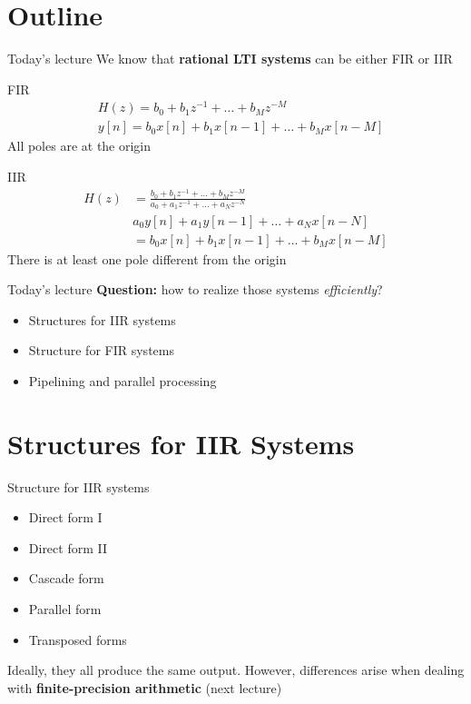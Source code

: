 \documentclass[10pt, handout]{beamer}
\begin{document}
\section{Outline}
%
\begin{frame}{Today's lecture}
We know that \textbf{rational LTI systems} can be either FIR or IIR
\begin{block}{FIR}
	\vspace{-0.5cm}
	\begin{align}
		&H(z) =  b_0 + b_1z^{-1} + \ldots + b_Mz^{-M} \tag{$z$-transform} \\
		&y[n] = b_0x[n] + b_1x[n-1] + \ldots + b_Mx[n-M] \tag{difference equation}
	\end{align}
	All poles are at the origin
\end{block}

\begin{block}{IIR}
	\vspace{-0.5cm}
	\begin{align*}
	H(z) &=  \frac{b_0 + b_1z^{-1} + \ldots + b_Mz^{-M}}{a_0 + a_1z^{-1} + \ldots + a_Nz^{-N}} \tag{$z$-transform} \\
	&a_0y[n] + a_1y[n-1] + \ldots + a_Nx[n-N]  \\
	&= b_0x[n] + b_1x[n-1] + \ldots + b_Mx[n-M] \tag{difference equation}
	\end{align*}
	There is at least one pole different from the origin
\end{block}

\end{frame}

%
\begin{frame}{Today's lecture}
	\textbf{Question:} how to realize those systems \textit{efficiently}?
	
	\begin{itemize}
		\item Structures for IIR systems
		\item Structure for FIR systems
		\item Pipelining and parallel processing
	\end{itemize}
\end{frame}

%
\section{Structures for IIR Systems}
\begin{frame}{Structure for IIR systems}
	\begin{itemize}
		\item Direct form I
		\item Direct form II
		\item Cascade form
		\item Parallel form
		\item Transposed forms
	\end{itemize}

	Ideally, they all produce the same output. However, differences arise when dealing with \textbf{finite-precision arithmetic} (next lecture)
\end{frame}
\end{document}
